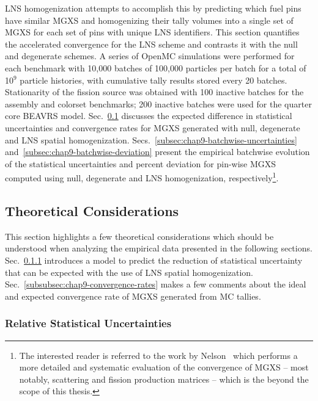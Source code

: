 \ac{LNS} homogenization attempts to accomplish this by predicting which fuel pins have similar \ac{MGXS} and homogenizing their tally volumes into a single set of \ac{MGXS} for each set of pins with unique \ac{LNS} identifiers. This section quantifies the accelerated convergence for the \ac{LNS} scheme and contrasts it with the null and degenerate schemes. A series of OpenMC simulations were performed for each benchmark with 10,000 batches of 100,000 particles per batch for a total of 10$^{9}$ particle histories, with cumulative tally results stored every 20 batches. Stationarity of the fission source was obtained with 100 inactive batches for the assembly and colorset benchmarks; 200 inactive batches were used for the quarter core \ac{BEAVRS} model. Sec.~\ref{subsec:chap9-theory} discusses the expected difference in statistical uncertainties and convergence rates for \ac{MGXS} generated with null, degenerate and \ac{LNS} spatial homogenization. Secs.~\ref{subsec:chap9-batchwise-uncertainties} and~\ref{subsec:chap9-batchwise-deviation} present the empirical batchwise evolution of the statistical uncertainties and percent deviation for pin-wise \ac{MGXS} computed using null, degenerate and \ac{LNS} homogenization, respectively\footnote{The interested reader is referred to the work by Nelson~\cite{nelson2014improved} which performs a more detailed and systematic evaluation of the convergence of \ac{MGXS} -- most notably, scattering and fission production matrices -- which is the beyond the scope of this thesis.}.

\subsection{Theoretical Considerations}
\label{subsec:chap9-theory}

This section highlights a few theoretical considerations which should be understood when analyzing the empirical data presented in the following sections. Sec.~\ref{subsubsec:chap9-relative-uncertainties} introduces a model to predict the reduction of statistical uncertainty that can be expected with the use of \ac{LNS} spatial homogenization. Sec.~\ref{subsubsec:chap9-convergence-rates} makes a few comments about the ideal and expected convergence rate of \ac{MGXS} generated from \ac{MC} tallies.

\subsubsection{Relative Statistical Uncertainties}
\label{subsubsec:chap9-relative-uncertainties}

